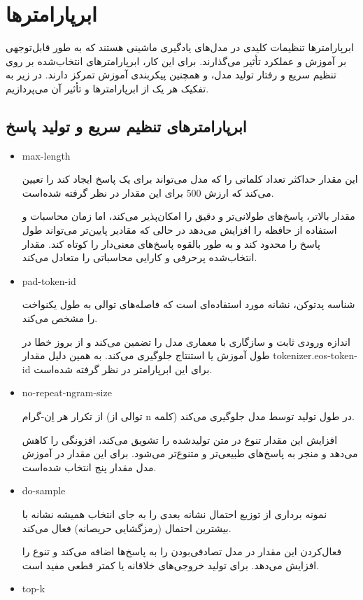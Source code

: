\section{ابرپارامترها}
ابرپارامترها تنظیمات کلیدی در مدل‌های یادگیری ماشینی هستند که به طور قابل‌توجهی بر آموزش و عملکرد تأثیر می‌گذارند. برای این کار، ابرپارامترهای انتخاب‌شده بر روی تنظیم سریع و رفتار تولید مدل، و همچنین پیکربندی آموزش تمرکز دارند. در زیر به تفکیک هر یک از ابرپارامترها و تأثیر آن می‌پردازیم.
\subsection{ابرپارامترهای تنظیم سریع و تولید پاسخ}

\begin{itemize}
\item
max-length

این مقدار حداکثر تعداد کلماتی را که مدل می‌تواند برای یک پاسخ ایجاد کند را تعیین می‌کند که ارزش 500 برای این مقدار در نظر گرفته شده‌است. 

 مقدار بالاتر، پاسخ‌های طولانی‌تر و دقیق را امکان‌پذیر می‌کند، اما زمان محاسبات و استفاده از حافظه را افزایش می‌دهد در حالی که مقادیر پایین‌تر می‌تواند طول پاسخ را محدود کند و به طور بالقوه پاسخ‌های معنی‌دار را کوتاه کند. مقدار انتخاب‌شده پرحرفی و کارایی محاسباتی را متعادل می‌کند.

\item
pad-token-id

شناسه پدتوکن، نشانه مورد استفاده‌ای است که فاصله‌های توالی به طول یکنواخت را مشخص می‌کند. 

اندازه ورودی ثابت و سازگاری با معماری مدل را تضمین می‌کند و از بروز خطا در طول آموزش یا استنتاج جلوگیری می‌کند. به همین دلیل مقدار tokenizer.eos-token-id برای این ابرپارامتر در نظر گرفته شده‌است.

\item
no-repeat-ngram-size

از تکرار هر اِن-گرام (توالی از n کلمه) در طول تولید توسط مدل جلوگیری می‌کند.

افزایش این مقدار تنوع در متن تولید‌شده را تشویق می‌کند، افزونگی را کاهش می‌دهد و منجر به پاسخ‌های طبیعی‌تر و متنوع‌تر می‌شود. برای این مقدار در آموزش مدل مقدار پنج انتخاب شده‌است.
\item
do-sample

نمونه‌ برداری از توزیع احتمال نشانه بعدی را به جای انتخاب همیشه نشانه با بیشترین احتمال (رمزگشایی حریصانه) فعال می‌کند.

 فعال‌کردن این مقدار در مدل تصادفی‌بودن را به پاسخ‌ها اضافه می‌کند و تنوع را افزایش می‌دهد.
 برای تولید خروجی‌های خلاقانه یا کمتر قطعی مفید است.
\item
top-k


\end{itemize}
